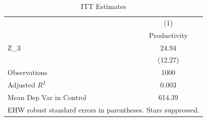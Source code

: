 \begin{table}[htbp]\centering
\caption{ITT Estimates}
\begin{tabular}{l*{1}{c}}
\hline\hline
                    &\multicolumn{1}{c}{(1)}\\
                    &\multicolumn{1}{c}{Productivity}\\
\hline
Z\_3                 &       24.94\\
                    &     (12.27)\\
\hline
Observations        &        1000\\
Adjusted \(R^{2}\)  &       0.003\\
Mean Dep Var in Control&      614.39\\
\hline\hline
\multicolumn{2}{l}{\footnotesize EHW robust standard errors in parentheses. Stars suppressed.}\\
\end{tabular}
\end{table}
